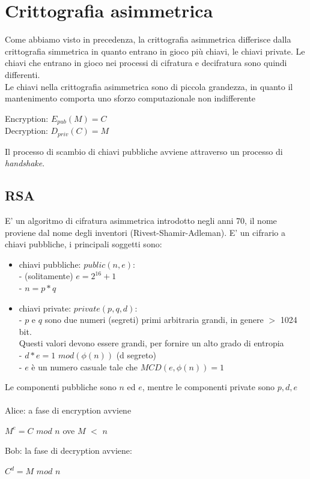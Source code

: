 \documentclass[11pt, oneside]{article}   	%
\begin{document}
\section*{Crittografia asimmetrica}
Come abbiamo visto in precedenza, la crittografia asimmetrica differisce dalla crittografia simmetrica in quanto entrano in gioco più chiavi, le chiavi private. Le chiavi che entrano in gioco nei processi di cifratura e decifratura sono quindi differenti. \\Le chiavi nella crittografia asimmetrica sono di piccola grandezza, in quanto il mantenimento comporta uno sforzo computazionale non indifferente
\begin{center}
Encryption: $E_{pub}(M) = C$ \\
Decryption: $D_{priv}(C) = M$ 
\end{center}
Il processo di scambio di chiavi pubbliche avviene attraverso un processo di \emph{handshake}.
\subsection*{RSA}
E' un algoritmo di cifratura asimmetrica introdotto negli anni 70, il nome proviene dal nome degli inventori (Rivest-Shamir-Adleman). E' un cifrario a chiavi pubbliche, i principali soggetti sono:
\begin{itemize}
\item chiavi pubbliche: $public(n,e)$:\\
- (solitamente) $e = 2^{16}+1$\\
- $n = p * q$
\item chiavi private: $private(p,q,d)$:\\
- $p$ e $q$ sono due numeri (segreti) primi arbitraria grandi, in genere $>$ 1024 bit.\\
Questi valori devono essere grandi, per fornire un alto grado di entropia\\
- $d * e = 1$ $mod(\phi(n))$ (d segreto) \\
- $e$ è un numero casuale tale che $MCD(e, \phi(n)) = 1$
\end{itemize}

Le componenti pubbliche sono $n$ ed $e$, mentre le componenti private sono $p, d, e$\\\\
Alice: a fase di encryption avviene \begin{center}
$M^{e} = C$ $mod$ $n$ ove $M$  $<$ $n$
\end{center}
Bob: la fase di decryption avviene: \begin{center}
$C^d = M$ $mod$ $n$
\end{center}
\end{document}
